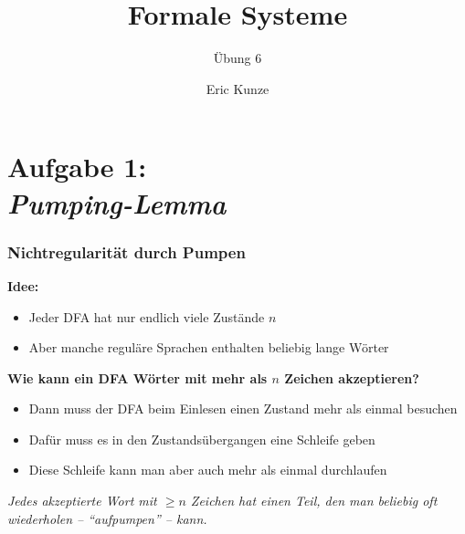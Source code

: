 \documentclass{beamer}
\begin{document}
	
	\title{Formale Systeme}
	\subtitle{Übung 6}
	\author{Eric Kunze}
	\date{}

	\maketitle

	

	\section{Aufgabe 1: \\ \itshape Pumping-Lemma}

	\newcommand{\colstackrel}[3]{\,{\stackrel{\textcolor{#3}{#1}}{\textcolor{#3}{#2}}}\,}
	\newcommand{\gstackrel}[2]{\colstackrel{#1}{#2}{darkgreen}}
	\newcommand{\bstackrel}[2]{\colstackrel{#1}{#2}{darkblue}}
	\newcommand{\rstackrel}[2]{\colstackrel{#1}{#2}{darkred}}
	
	\begin{frame}\frametitle{Nichtregularität durch Pumpen}	
		\small	
		\textbf{Idee:}
		\begin{itemize}
			\item Jeder DFA hat nur endlich viele Zustände $n$
			\item Aber manche reguläre Sprachen enthalten beliebig lange Wörter
		\end{itemize}
		
		\textbf{Wie kann ein DFA Wörter mit mehr als $n$ Zeichen akzeptieren?}
		
		\begin{itemize}
			\item Dann muss der DFA beim Einlesen einen Zustand mehr als einmal besuchen
			\item Dafür muss es in den Zustandsübergangen eine Schleife geben
			\item Diese Schleife kann man aber auch mehr als einmal durchlaufen
		\end{itemize}
		
		\begin{center}
			\itshape
			Jedes akzeptierte Wort mit $\geq n$ Zeichen hat einen Teil, den man beliebig oft wiederholen -- "`aufpumpen"' -- kann.
		\end{center}
		
	\end{frame}
	
\end{document}
